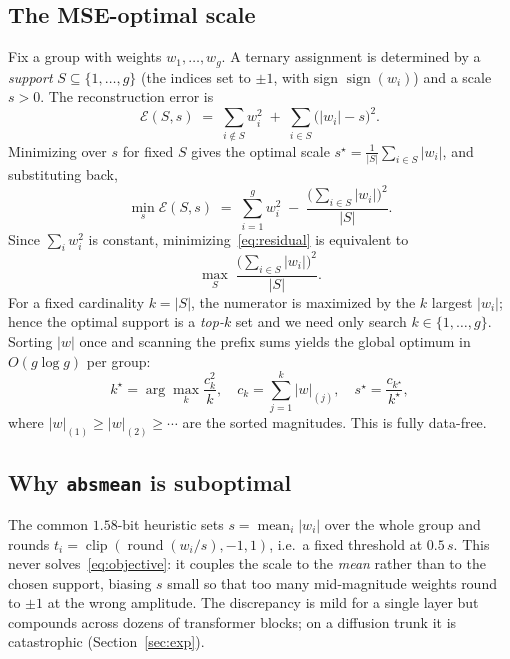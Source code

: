 \documentclass[11pt]{article}
\newcommand{\sign}{\operatorname{sign}}
\begin{document}
\subsection{The MSE-optimal scale}
Fix a group with weights $w_1,\dots,w_g$. A ternary assignment is determined by a
\emph{support} $S\subseteq\{1,\dots,g\}$ (the indices set to $\pm1$, with sign
$\sign(w_i)$) and a scale $s>0$. The reconstruction error is
\begin{equation}
  \mathcal{E}(S,s) \;=\; \sum_{i\notin S} w_i^2 \;+\; \sum_{i\in S}\bigl(|w_i|-s\bigr)^2 .
\end{equation}
Minimizing over $s$ for fixed $S$ gives the optimal scale
$s^\star = \tfrac{1}{|S|}\sum_{i\in S}|w_i|$, and substituting back,
\begin{equation}
  \min_s \mathcal{E}(S,s)
  \;=\; \sum_{i=1}^{g} w_i^2 \;-\; \frac{\bigl(\sum_{i\in S}|w_i|\bigr)^2}{|S|}.
  \label{eq:residual}
\end{equation}
Since $\sum_i w_i^2$ is constant, minimizing~\eqref{eq:residual} is equivalent to
\begin{equation}
  \max_{S}\; \frac{\bigl(\sum_{i\in S}|w_i|\bigr)^2}{|S|}.
  \label{eq:objective}
\end{equation}
For a fixed cardinality $k=|S|$, the numerator is maximized by the $k$ largest
$|w_i|$; hence the optimal support is a \emph{top-$k$} set and we need only search
$k\in\{1,\dots,g\}$. Sorting $|w|$ once and scanning the prefix sums yields the
global optimum in $O(g\log g)$ per group:
\begin{equation}
  k^\star=\arg\max_k \frac{c_k^2}{k},\quad
  c_k=\sum_{j=1}^{k}|w|_{(j)},\quad
  s^\star=\frac{c_{k^\star}}{k^\star},
\end{equation}
where $|w|_{(1)}\ge|w|_{(2)}\ge\cdots$ are the sorted magnitudes. This is fully
data-free.

\subsection{Why \texttt{absmean} is suboptimal}
The common $1.58$-bit heuristic sets $s=\operatorname{mean}_i|w_i|$ over the whole
group and rounds $t_i=\operatorname{clip}(\operatorname{round}(w_i/s),-1,1)$,
i.e.\ a fixed threshold at $0.5\,s$. This never solves~\eqref{eq:objective}: it
couples the scale to the \emph{mean} rather than to the chosen support, biasing
$s$ small so that too many mid-magnitude weights round to $\pm1$ at the wrong
amplitude. The discrepancy is mild for a single layer but compounds across dozens
of transformer blocks; on a diffusion trunk it is catastrophic
(Section~\ref{sec:exp}).
\end{document}
